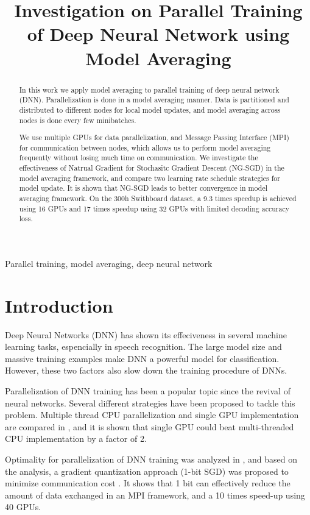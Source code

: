\documentclass{article}
\title{Investigation on Parallel Training of Deep Neural Network using Model Averaging}
\begin{document}
%
\maketitle
%
\begin{abstract}
In this work we apply model averaging to parallel training of deep neural network (DNN). 
Parallelization is done in a model averaging manner. Data is partitioned and distributed to different nodes for 
local model updates, and model averaging across nodes is done every few minibatches. 

We use multiple GPUs for data parallelization, and Message Passing Interface (MPI) for communication between nodes,
which allows us to perform model averaging frequently without losing much time on communication.
We investigate the effectiveness of Natrual Gradient for Stochasitc Gradient Descent (NG-SGD) in the model averaging
framework, and compare two learning rate schedule strategies for model update. It is shown that NG-SGD leads to better
convergence in model averaging framework. On the 300h Swithboard dataset, a 9.3 times speedup is achieved using 16 GPUs
and 17 times speedup using 32 GPUs with limited decoding accuracy loss. 
\end{abstract}
%
\begin{keywords}
Parallel training, model averaging, deep neural network
\end{keywords}
%
\section{Introduction}
\label{sec:intro}
Deep Neural Networks (DNN) has shown its effeciveness in several machine learning tasks, espencially in speech
recognition. The large model size and massive training examples make DNN a powerful model for classification. However,
these two factors also slow down the training procedure of DNNs.

Parallelization of DNN training has been a popular topic since the revival of neural networks. Several different strategies
have been proposed to tackle this problem. Multiple thread CPU parallelization and single GPU implementation are compared
in \cite{scanzio2010parallel,vesely2010parallel}, and it is shown that single GPU could beat multi-threaded CPU implementation
by a factor of 2.

Optimality for parallelization of DNN training was analyzed in \cite{seide2014parallelizability}, and based on the analysis, 
a gradient quantization approach (1-bit SGD) was proposed to minimize communication cost \cite{seide20141}. It shows that 1 bit
can effectively reduce the amount of data exchanged in an MPI framework, and a 10 times speed-up using 40 GPUs.
\end{document}
